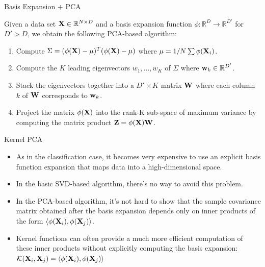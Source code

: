 \documentclass[serif,xcolor=pdftex,dvipsnames,table,hyperref={bookmarks=false,breaklinks}]{beamer}
\begin{document}
\begin{frame}[t]{Basis Expansion + PCA}

Given a data set ${\mathbf{X}}\in\mathbb{R}^{N\times D}$ and a basis expansion 
function $\phi: \mathbb{R}^D \rightarrow \mathbb{R}^{D'}$ for $D'>D$, we obtain 
the following PCA-based algorithm:

\begin{enumerate}
\pause \item Compute $\Sigma = (\phi({\mathbf{X}})-\mu)^T(\phi({\mathbf{X}})-\mu)$ where 
$\mu=1/N\sum \phi({\mathbf{X}}_i)$.

\pause\item Compute the $K$ leading eigenvectors $w_1,...,w_K$ of $\Sigma$ 
where ${\mathbf{w}}_k \in \mathbb{R}^{D'}$.

\pause\item Stack the eigenvectors together into a $D' \times K$ matrix 
${\mathbf{W}}$ where each column $k$ of ${\mathbf{W}}$ corresponds to ${\mathbf{w}}_k$.

\pause\item Project the matrix $\phi({\mathbf{X}})$ into the rank-K sub-space of 
maximum variance by computing the matrix product ${\mathbf{Z}}=\phi({\mathbf{X}}){\mathbf{W}}$.
\end{enumerate} 
\end{frame}

\begin{frame}[t]{Kernel PCA}
\begin{itemize}
\item As in the classification case, it becomes very expensive to use an 
explicit basis function expansion that maps data into a high-dimensional space.

\pause\item In the basic SVD-based algorithm, there's no way to avoid this 
problem.

\pause\item In the PCA-based algorithm, it's not hard to show that the sample 
covariance matrix obtained after the basis expansion depends only on inner 
products of the form $\langle\phi({\mathbf{X}}_i),\phi({\mathbf{X}}_j)\rangle$. 

\pause\item Kernel functions can often provide a much more efficient 
computation of these inner products without explicitly computing the basis 
expansion: $\mathcal{K}({\mathbf{X}}_i, {\mathbf{X}}_j) = 
\langle\phi({\mathbf{X}}_i),\phi({\mathbf{X}}_j)\rangle$
\end{itemize}
\end{frame}
\end{document}
